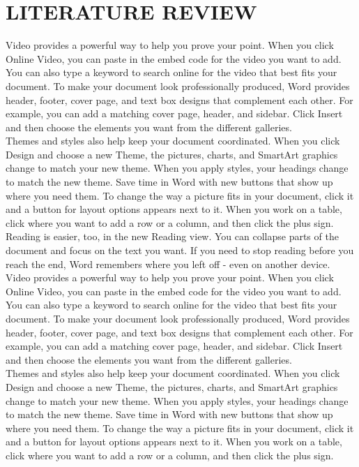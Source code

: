 \documentclass[12pt,a4paper]{report}
\begin{document}
\chapter{LITERATURE REVIEW}
Video provides a powerful way to help you prove your point. When you click Online Video, you can paste in the embed code for the video you want to add. You can also type a keyword to search online for the video that best fits your document.
To make your document look professionally produced, Word provides header, footer, cover page, and text box designs that complement each other. For example, you can add a matching cover page, header, and sidebar. Click Insert and then choose the elements you want from the different galleries.\\
Themes and styles also help keep your document coordinated. When you click Design and choose a new Theme, the pictures, charts, and SmartArt graphics change to match your new theme. When you apply styles, your headings change to match the new theme.
Save time in Word with new buttons that show up where you need them. To change the way a picture fits in your document, click it and a button for layout options appears next to it. When you work on a table, click where you want to add a row or a column, and then click the plus sign.\\
Reading is easier, too, in the new Reading view. You can collapse parts of the document and focus on the text you want. If you need to stop reading before you reach the end, Word remembers where you left off - even on another device.
Video provides a powerful way to help you prove your point. When you click Online Video, you can paste in the embed code for the video you want to add. You can also type a keyword to search online for the video that best fits your document.
To make your document look professionally produced, Word provides header, footer, cover page, and text box designs that complement each other. For example, you can add a matching cover page, header, and sidebar. Click Insert and then choose the elements you want from the different galleries.\\
Themes and styles also help keep your document coordinated. When you click Design and choose a new Theme, the pictures, charts, and SmartArt graphics change to match your new theme. When you apply styles, your headings change to match the new theme.
Save time in Word with new buttons that show up where you need them. To change the way a picture fits in your document, click it and a button for layout options appears next to it. When you work on a table, click where you want to add a row or a column, and then click the plus sign.\\
\end{document}
